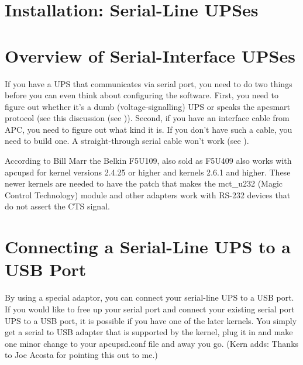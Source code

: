{{{{{{{\label{Installation-on-Serial_002dLine-UPSes}

\section*{Installation: Serial-Line UPSes}

\label{Overview-of-Serial_002dInterface-UPSes}

\section*{Overview of Serial-Interface UPSes}

\label{index-Serial-UPSes-189}
If you have a UPS that communicates via serial port, you need to do two things
before you can even think about configuring the software. First, you need to
figure out whether it's a dumb (voltage-signalling) UPS or speaks the apcsmart
protocol (see this discussion (see 
)).  Second, if you have an interface
cable from APC, you need to figure out what kind it is.  If you don't have
such a cable, you need to build one.  A straight-through serial cable won't
work (see 
).  

According to Bill Marr the Belkin F5U109, also sold as F5U409 also works with
apcupsd for kernel versions 2.4.25 or higher and kernels 2.6.1 and higher. 
These newer kernels are needed to have the patch that makes the mct\_u232
(Magic Control Technology) module and other adapters work with RS-232 devices
that do not assert the CTS signal. 

\label{Connecting-a-Serial_002dLine-UPS-to-a-USB-Port}

\section*{Connecting a Serial-Line UPS to a USB Port}

\label{index-Serial-on-USB-190}
By using a special adaptor, you can connect your serial-line UPS to a USB
port. If you would like to free up your serial port and connect your existing
serial port UPS to a USB port, it is possible if you have one of the later
kernels. You simply get a serial to USB adapter that is supported by the
kernel, plug it in and make one minor change to your apcupsd.conf file and
away you go. (Kern adds: Thanks to Joe Acosta for pointing this out to me.)  

}}}}}}}
